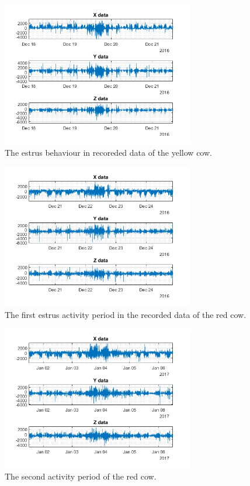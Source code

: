 \documentclass[english,12pt,a4paper,pdftex,elec,utf8]{aaltothesis}
\begin{document}
\begin{figure}[htb]
\centering
\includegraphics[width = 0.75\textwidth]{figures/keltainenkiimadata.png}
\caption{The estrus behaviour in recoreded data of the yellow cow.}
\label{keltainenkiimadata}
\end{figure}

\begin{figure}[htb]
\centering
\includegraphics[width = 0.75\textwidth]{figures/punainenkiimadata1.png}
\caption{The first estrus activity period in the recorded data of the red cow.}
\label{punainenkiimadata1}
\end{figure}

\begin{figure}[htb]
\centering
\includegraphics[width = 0.75\textwidth]{figures/punainenkiimadata2.png}
\caption{The second activity period of the red cow.}
\label{punainenkiimadata2}
\end{figure}
\end{document}
